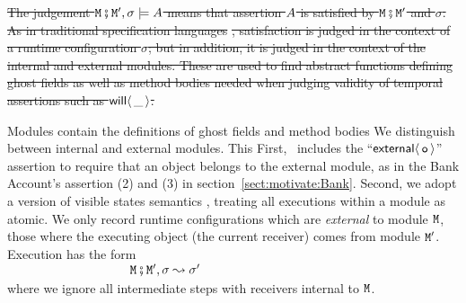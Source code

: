 
\st{The judgement ${\mbox{\tt{\ensuremath{{\mbox{\tt{M}}}}}}} \fatsemi  {{\mbox{\tt{\ensuremath{{\mbox{\tt{M}}}}}}}'},\sigma \models A$ means that  
assertion $A$ is satisfied by  ${\mbox{\tt{\ensuremath{{\mbox{\tt{M}}}}}}} \fatsemi  {{\mbox{\tt{\ensuremath{{\mbox{\tt{M}}}}}}}'}$ and $\sigma$.
As in traditional specification languages} \cite{Leavens-etal07,Meyer92}\st{, satisfaction is judged 
in the context of a runtime configuration $\sigma$; but in addition, it is judged in the context of the internal and external modules.
These are used to find abstract functions defining ghost fields as well as  method bodies
needed when judging validity of temporal assertions such as
${\mathsf{will}}\langle \,\_\,\rangle$.} %





Modules contain the definitions of ghost fields and method bodies  We distinguish between internal and external modules. This %
First, 
\Chainmail\ includes the ``${\mathsf{external}}\langle\, {\mbox{\tt{o}}}\, \rangle$'' assertion to require
that an object belongs to the external module, as in the Bank
Account's assertion (2) and (3) in
section~\ref{sect:motivate:Bank}. Second, we adopt a version of
visible states semantics \cite{MuellerPoetzsch-HeffterLeavens06,larch93,Meyer97}, treating all
executions within a module as atomic.
We only record runtime configurations which are {\em external}
 to module ${\mbox{\tt{\ensuremath{{\mbox{\tt{M}}}}}}}$, \ie those where the
 executing object (\ie the current receiver) comes from module ${\mbox{\tt{\ensuremath{{\mbox{\tt{M}}}}}}}'$.
 Execution %
 has the form\\
 $~ \strut  \hspace{1.3in}    {\mbox{\tt{\ensuremath{{\mbox{\tt{M}}}}}}} \fatsemi  {{\mbox{\tt{\ensuremath{{\mbox{\tt{M}}}}}}}'},\sigma \leadsto \sigma'$\\  
where we ignore all intermediate steps
 with receivers  internal to ${\mbox{\tt{\ensuremath{{\mbox{\tt{M}}}}}}}$. 
%

